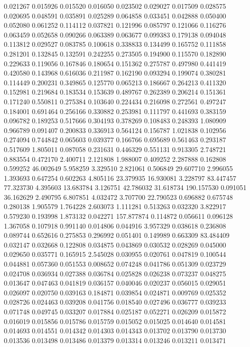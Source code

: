 0.021267
0.015926
0.015520
0.016050
0.023502
0.029027
0.017509
0.028575
0.020695
0.048591
0.035891
0.025289
0.064858
0.033451
0.042888
0.050400
0.052080
0.061252
0.114112
0.037821
0.121996
0.085797
0.121066
0.116276
0.063459
0.052658
0.090266
0.063389
0.063677
0.099383
0.179138
0.094048
0.113812
0.029527
0.083785
0.100618
0.338833
0.134499
0.165752
0.111858
0.281201
0.132845
0.132591
0.242255
0.273505
0.194900
0.115570
0.182890
0.229633
0.119056
0.167846
0.180654
0.151362
0.275787
0.497980
0.441419
0.420580
0.143968
0.616036
0.211987
0.162190
0.093294
0.199074
0.380281
0.114449
0.200231
0.349865
0.125770
0.065213
0.186667
0.264213
0.411320
0.152981
0.219684
0.183534
0.153639
0.489767
0.262389
0.206214
0.151361
0.171240
0.550811
0.275384
0.103640
0.224434
0.216098
0.272561
0.497247
0.184001
0.691464
0.256166
0.330882
0.253981
0.111797
0.441693
0.383159
0.096782
0.189253
0.517666
0.304193
0.378269
0.108483
0.248393
1.080909
0.966789
0.091407
0.200833
0.336913
0.564124
0.156787
1.021838
0.102956
0.274094
0.744842
0.065603
0.039377
0.166766
0.695689
0.561463
0.293187
0.517609
1.805011
0.087058
0.231631
0.446329
0.551131
0.913305
2.748721
0.883554
0.472170
2.400711
2.121808
1.988007
0.409252
2.287888
0.162808
0.599252
46.002649
5.958259
3.329510
2.821061
0.506849
29.607710
2.996055
1.393693
0.647254
0.602263
4.805116
23.379935
16.930081
3.228797
83.447457
77.323730
4.395603
13.683784
3.126751
42.786032
31.618734
190.157530
0.091051
36.162629
2.490795
6.807851
4.032472
3.707700
22.790523
0.696882
0.675748
0.280138
1.905579
1.764228
2.603073
1.111281
0.513263
0.032320
3.822917
0.579230
0.193998
1.873132
0.042271
157.877874
0.114872
0.056611
0.096128
1.367058
0.107918
0.991140
0.014806
0.044916
3.957329
0.038618
0.236808
0.089744
0.652616
0.275853
0.296992
0.051401
0.149989
0.663309
83.484409
0.032147
0.032668
0.122808
0.034875
0.043869
0.030532
0.028269
0.045000
0.029650
0.035771
0.165915
2.545028
0.030955
0.020761
0.047819
0.100544
0.044881
0.057360
0.051553
0.008652
0.074248
0.041786
0.051309
0.023729
0.024708
0.036934
0.027388
0.036784
0.025828
0.026238
0.073237
0.048275
0.013647
0.047463
0.041819
0.036157
0.040046
0.020237
0.056015
0.029051
0.026097
0.020750
0.039163
0.184871
0.039854
0.024871
0.009769
0.025352
0.028726
0.024463
0.039208
0.041756
0.018540
0.027496
0.036777
0.039233
0.071748
0.049745
0.033207
0.017884
0.025187
0.052271
0.026209
0.015872
0.016019
0.015856
0.015786
0.015759
0.015052
0.015025
0.014640
0.014581
0.014693
0.014551
0.014342
0.014303
0.014343
0.013702
0.013790
0.013730
0.013536
0.013498
0.013486
0.013379
0.013314
0.013246
0.013211
0.013471
